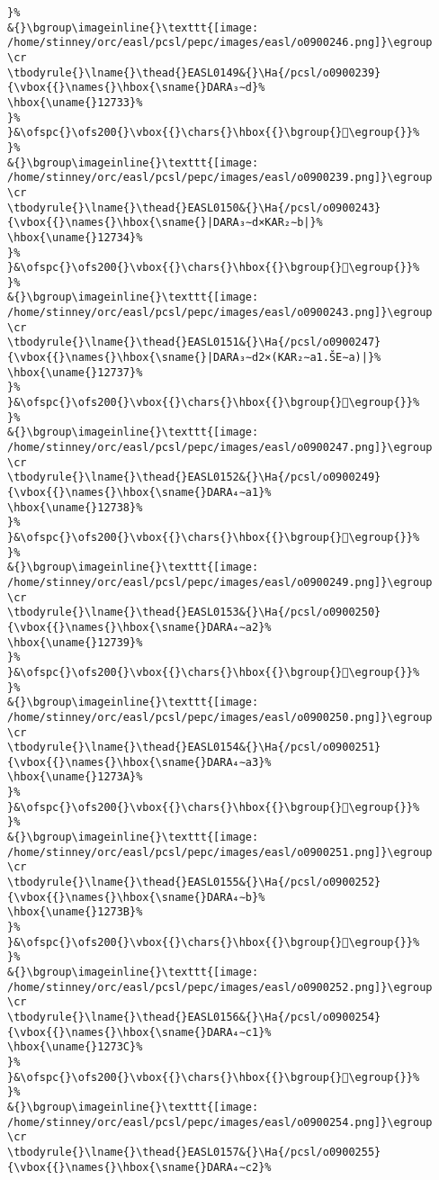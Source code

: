 \begin{verbatim}
}%
&{}\bgroup\imageinline{}\texttt{[image: /home/stinney/orc/easl/pcsl/pepc/images/easl/o0900246.png]}\egroup
\cr
\tbodyrule{}\lname{}\thead{}EASL0149&{}\Ha{/pcsl/o0900239}{\vbox{{}\names{}\hbox{\sname{}DARA₃∼d}%
\hbox{\uname{}12733}%
}%
}&\ofspc{}\ofs200{}\vbox{{}\chars{}\hbox{{}\bgroup{}𒜳\egroup{}}%
}%
&{}\bgroup\imageinline{}\texttt{[image: /home/stinney/orc/easl/pcsl/pepc/images/easl/o0900239.png]}\egroup
\cr
\tbodyrule{}\lname{}\thead{}EASL0150&{}\Ha{/pcsl/o0900243}{\vbox{{}\names{}\hbox{\sname{}|DARA₃∼d×KAR₂∼b|}%
\hbox{\uname{}12734}%
}%
}&\ofspc{}\ofs200{}\vbox{{}\chars{}\hbox{{}\bgroup{}𒜴\egroup{}}%
}%
&{}\bgroup\imageinline{}\texttt{[image: /home/stinney/orc/easl/pcsl/pepc/images/easl/o0900243.png]}\egroup
\cr
\tbodyrule{}\lname{}\thead{}EASL0151&{}\Ha{/pcsl/o0900247}{\vbox{{}\names{}\hbox{\sname{}|DARA₃∼d2×(KAR₂∼a1.ŠE∼a)|}%
\hbox{\uname{}12737}%
}%
}&\ofspc{}\ofs200{}\vbox{{}\chars{}\hbox{{}\bgroup{}𒜷\egroup{}}%
}%
&{}\bgroup\imageinline{}\texttt{[image: /home/stinney/orc/easl/pcsl/pepc/images/easl/o0900247.png]}\egroup
\cr
\tbodyrule{}\lname{}\thead{}EASL0152&{}\Ha{/pcsl/o0900249}{\vbox{{}\names{}\hbox{\sname{}DARA₄∼a1}%
\hbox{\uname{}12738}%
}%
}&\ofspc{}\ofs200{}\vbox{{}\chars{}\hbox{{}\bgroup{}𒜸\egroup{}}%
}%
&{}\bgroup\imageinline{}\texttt{[image: /home/stinney/orc/easl/pcsl/pepc/images/easl/o0900249.png]}\egroup
\cr
\tbodyrule{}\lname{}\thead{}EASL0153&{}\Ha{/pcsl/o0900250}{\vbox{{}\names{}\hbox{\sname{}DARA₄∼a2}%
\hbox{\uname{}12739}%
}%
}&\ofspc{}\ofs200{}\vbox{{}\chars{}\hbox{{}\bgroup{}𒜹\egroup{}}%
}%
&{}\bgroup\imageinline{}\texttt{[image: /home/stinney/orc/easl/pcsl/pepc/images/easl/o0900250.png]}\egroup
\cr
\tbodyrule{}\lname{}\thead{}EASL0154&{}\Ha{/pcsl/o0900251}{\vbox{{}\names{}\hbox{\sname{}DARA₄∼a3}%
\hbox{\uname{}1273A}%
}%
}&\ofspc{}\ofs200{}\vbox{{}\chars{}\hbox{{}\bgroup{}𒜺\egroup{}}%
}%
&{}\bgroup\imageinline{}\texttt{[image: /home/stinney/orc/easl/pcsl/pepc/images/easl/o0900251.png]}\egroup
\cr
\tbodyrule{}\lname{}\thead{}EASL0155&{}\Ha{/pcsl/o0900252}{\vbox{{}\names{}\hbox{\sname{}DARA₄∼b}%
\hbox{\uname{}1273B}%
}%
}&\ofspc{}\ofs200{}\vbox{{}\chars{}\hbox{{}\bgroup{}𒜻\egroup{}}%
}%
&{}\bgroup\imageinline{}\texttt{[image: /home/stinney/orc/easl/pcsl/pepc/images/easl/o0900252.png]}\egroup
\cr
\tbodyrule{}\lname{}\thead{}EASL0156&{}\Ha{/pcsl/o0900254}{\vbox{{}\names{}\hbox{\sname{}DARA₄∼c1}%
\hbox{\uname{}1273C}%
}%
}&\ofspc{}\ofs200{}\vbox{{}\chars{}\hbox{{}\bgroup{}𒜼\egroup{}}%
}%
&{}\bgroup\imageinline{}\texttt{[image: /home/stinney/orc/easl/pcsl/pepc/images/easl/o0900254.png]}\egroup
\cr
\tbodyrule{}\lname{}\thead{}EASL0157&{}\Ha{/pcsl/o0900255}{\vbox{{}\names{}\hbox{\sname{}DARA₄∼c2}%

\end{verbatim}
